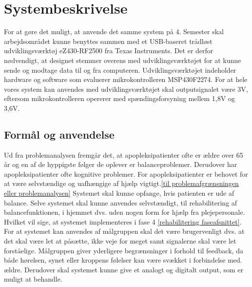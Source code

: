 \section{Systembeskrivelse}
For at gøre det muligt, at anvende det samme system på 4. Semester skal arbejdsområdet kunne benyttes sammen med et USB-baseret trådløst udviklingsværktøj eZ430-RF2500 fra Texas Instruments. Det er derfor nødvendigt, at designet stemmer overens med udviklingsværktøjet for at kunne sende og modtage data til og fra computeren. Udviklingsværktøjet indeholder hardware og software som evaluerer mikrokontrolleren MSP430F2274. For at hele vores system kan anvendes med udviklingsværktøjet skal outputsignalet være 3V, eftersom mikrokontrolleren opererer med spændingsforsyning mellem 1,8V og 3,6V.  

\subsection{Formål og anvendelse}
Ud fra problemanalysen fremgår det, at apopleksipatienter ofte er ældre over 65 år og en af de hyppigste følger de oplever er balanceproblemer. Derudover har apopleksipatienter ofte kognitive problemer. For apopleksipatienter er behovet for at være selvstændige og uafhængige af hjælp vigtigt.\ref{til problemafgrænsningen eller problemanalysen}  
Systemet skal kunne opfange, hvis patienten er ude af balance. Selve systemet skal kunne anvendes selvstændigt, til rehabilitering af balancefunktionen, i hjemmet dvs. uden nogen form for hjælp fra plejepersonale. Hvilket vil sige, at systemet implementeres i fase 4 \ref{rehabilitering faseafsnittet}. For at systemet kan anvendes af målgruppen skal det være brugervenligt dvs. at det skal være let at påsætte, ikke veje for meget samt signalerne skal være let forståelige. Målgruppen giver yderligere begrænsninger i forhold til feedback, da både hørelsen, synet eller kroppens følelser kan være svækket i forbindelse med. ældre. Derudover skal systemet kunne give et analogt og digitalt output, som er muligt at behandle.


